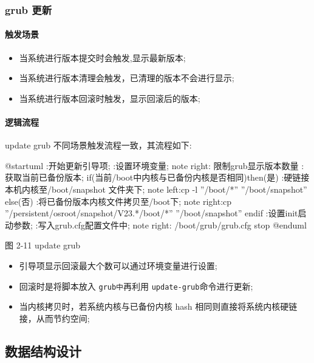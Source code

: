 \documentclass{utart}
\begin{document}
\subsubsection{grub 更新}
\paragraph{触发场景}
\begin{itemize}[leftmargin=4em]
  \item 当系统进行版本提交时会触发,显示最新版本;
  \item 当系统进行版本清理会触发，已清理的版本不会进行显示;
  \item 当系统进行版本回滚时触发，显示回滚后的版本;
\end{itemize}
\paragraph{逻辑流程}
update grub 不同场景触发流程一致，其流程如下: 
\begin{center}
  \begin{adjustbox}{scale=0.65}
    \begin{plantuml}
      @startuml
      :开始更新引导项;
      :设置环境变量;
      note right: 限制grub显示版本数量
      :获取当前已备份版本;
      if(当前/boot中内核与已备份内核是否相同)then(是)
      :硬链接本机内核至/boot/snapshot 文件夹下;
      note left:cp -l ”/boot/*” ”/boot/snapshot”
      else(否)
      :将已备份版本内核文件拷贝至/boot下;
      note right:cp ”/persistent/osroot/snapshot/V23.*/boot/*” ”/boot/snapshot”
      endif
      :设置init启动参数;
      :写入grub.cfg配置文件中;
      note right: /boot/grub/grub.cfg
      stop
      @enduml      
    \end{plantuml}
  \end{adjustbox}

  图 2-11 update grub
\end{center}
\begin{itemize}[leftmargin=4em]
  \item 引导项显示回滚最大个数可以通过环境变量进行设置;
  \item 回滚时是将脚本放入 \texttt{grub中}再利用 \texttt{update-grub}命令进行更新;
  \item 当内核拷贝时，若系统内核与已备份内核 hash 相同则直接将系统内核硬链接，从而节约空间;
\end{itemize}


\subsection{数据结构设计}
\end{document}
